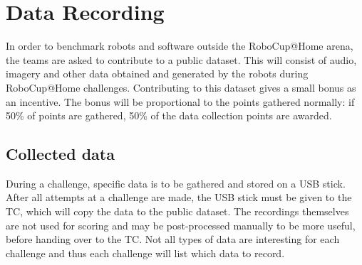 \section{Data Recording}
  \label{rule:datarecording}
  In order to benchmark robots and software outside the RoboCup@Home arena, the teams are asked to contribute to a public dataset.
  This will consist of audio, imagery and other data obtained and generated by the robots during RoboCup@Home challenges.
  Contributing to this dataset gives a small bonus as an incentive. 
  The bonus will be proportional to the points gathered normally: 
    if 50\% of points are gathered, 50\% of the data collection points are awarded. 
    
  \subsection{Collected data}
    During a challenge, specific data is to be gathered and stored on a USB stick. 
    After all attempts at a challenge are made, the USB stick must be given to the TC, which will copy the data to the public dataset.
    The recordings themselves are not used for scoring and may be post-processed manually to be more useful, before handing over to the TC. 
    Not all types of data are interesting for each challenge and thus each challenge will list which data to record. 
    

